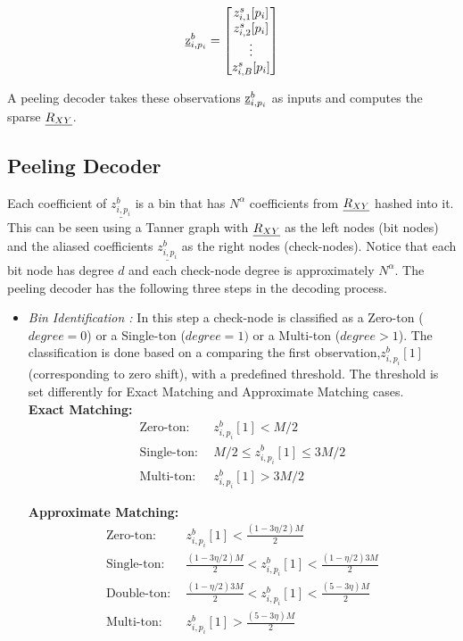 \begin{enumerate}
	 \[ \underline{\mathrm{z}}^{b}_{i,p_i} = \begin{bmatrix}
	 z^{s}_{i,1}[p_i] \\
	 z^{s}_{i,2}[p_i] \\
	 \vdots\\
	 z^{s}_{i,B}[p_i]
	 \end{bmatrix}  \]
	 
	  A peeling decoder takes these observations $ \underline{\mathrm{z}}^{b}_{i,p_i}$ as inputs and computes the sparse $\underline{R_{XY}}$.
	 
	 \subsection{Peeling Decoder}
		
	 Each coefficient of $\underline{z^{b}_{i,p_i}}$ is a bin that has $N^{\alpha}$ coefficients from $\underline{R_{XY}}$ hashed into it. This can be seen using a Tanner graph with $\underline{R_{XY}}$ as the left nodes (bit nodes) and the aliased coefficients  $\underline{z^{b}_{i,p_i}}$ as the right nodes (check-nodes). Notice that each bit node has degree $d$ and each check-node degree is approximately $N^{\alpha}$. The peeling decoder has the following three steps in the decoding process.
		 \begin{itemize}
		 	\setlength{\itemindent}{.1in}
			 \item \textit{Bin Identification :} In this step a check-node is classified as a Zero-ton ($degree = 0$) or a Single-ton ($degree = 1)$ or a Multi-ton ($degree >1$). The classification is done based on a comparing the first observation,$z^{b}_{i,p_i}[1]$ (corresponding to zero shift), with a predefined threshold. The threshold is set differently for Exact Matching and Approximate Matching cases.\\
			 {\bf Exact Matching:} 
			                \[
			                \begin{array}{ll}
			                \text{Zero-ton:}& \ \ z^{b}_{i,p_i}[1] < M/2 \\
			                \text{Single-ton:}& \ \ M/2 \leq z^{b}_{i,p_i}[1] \leq 3M/2 \\ 
			                \text{Multi-ton:}& \ \ z^{b}_{i,p_i}[1] > 3M/2
			                \end{array}
			                \]   
			                
			 {\bf Approximate Matching:} 
			 \[
			 \begin{array}{ll}
			 \text{Zero-ton:}& \ \ z^{b}_{i,p_i}[1] < \frac{(1-3\eta/2)M}{2} \\ 
			 \text{Single-ton:}& \ \ \frac{(1-3\eta/2)M}{2} < z^{b}_{i,p_i}[1] < \frac{(1-\eta/2)3M}{2}   \\
			 \text{Double-ton:}& \ \ \frac{(1-\eta/2)3M}{2} < z^{b}_{i,p_i}[1] < \frac{(5-3\eta)M}{2}\\ 
			 \text{Multi-ton:}& \ \ z^{b}_{i,p_i}[1] > \frac{(5-3\eta)M}{2}\\
			 \end{array}
			 \] 
			   

\end{itemize}
\end{enumerate}
